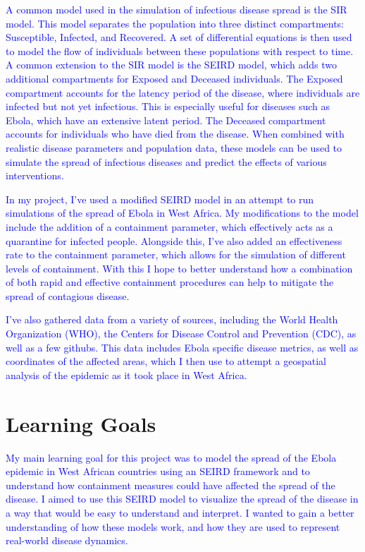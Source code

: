 \documentclass[%
 reprint,
superscriptaddress,
 amsmath,amssymb,
 aps,
floatfix,
]{revtex4-2}
\begin{document}
\textcolor{blue}{
    A common model used in the simulation of infectious disease spread is the SIR model. 
    This model separates the population into three distinct compartments: Susceptible, Infected, and Recovered. 
    A set of differential equations is then used to model the flow of individuals between these populations with respect to time. 
    A common extension to the SIR model is the SEIRD model, which adds two additional compartments for Exposed and Deceased individuals. 
    The Exposed compartment accounts for the latency period of the disease, where individuals are infected but not yet infectious. 
    This is especially useful for diseases such as Ebola, which have an extensive latent period. 
    The Deceased compartment accounts for individuals who have died from the disease.
    When combined with realistic disease parameters and population data, these models can be used to simulate the spread of infectious diseases and predict the effects of various interventions.}

\textcolor{blue}{
    In my project, I've used a modified SEIRD model in an attempt to run simulations of the spread of Ebola in West Africa.
    My modifications to the model include the addition of a containment parameter, which effectively acts as a quarantine for infected people. 
    Alongside this, I've also added an effectiveness rate to the containment parameter, which allows for the simulation of different levels of containment. 
    With this I hope to better understand how a combination of both rapid and effective containment procedures can help to mitigate the spread of contagious disease.}

\textcolor{blue}{I've also gathered data from a variety of sources, including the World Health Organization (WHO), the Centers for Disease Control and Prevention (CDC), as well as a few githubs. 
This data includes Ebola specific disease metrics, as well as coordinates of the affected areas,
which I then use to attempt a geospatial analysis of the epidemic as it took place in West Africa.}

\section{Learning Goals}

\textcolor{blue}{
    My main learning goal for this project was to model the spread of the Ebola epidemic in West African countries using an SEIRD framework and to understand how containment measures could have affected the spread of the disease. 
    I aimed to use this SEIRD model to visualize the spread of the disease in a way that would be easy to understand and interpret.
    I wanted to gain a better understanding of how these models work, and how they are used to represent real-world disease dynamics.}
\end{document}
